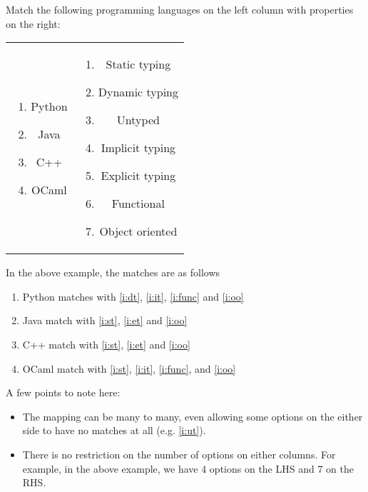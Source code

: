 \documentclass[12pt]{report}
\begin{document}
\begin{mdframed}
Match the following programming languages on the left column with properties on the right:

\begin{tabular}{c @{} c}
\begin{minipage}{0.4\textwidth}
\begin{enumerate}
\item Python
\item Java
\item C++
\item OCaml
\end{enumerate}
\end{minipage}
&
\begin{minipage}{0.4\textwidth}
\begin{enumerate}[label=\Alph*.]
\item \label{i:st} Static typing
\item \label{i:dt} Dynamic typing
\item \label{i:ut} Untyped
\item \label{i:it} Implicit typing
\item \label{i:et} Explicit typing
\item \label{i:func} Functional
\item \label{i:oo} Object oriented
\end{enumerate}
\end{minipage}
\end{tabular}
\end{mdframed}

In the above example, the matches are as follows
\begin{enumerate}
\item Python matches with \ref{i:dt}, \ref{i:it}, \ref{i:func} and \ref{i:oo}
\item Java match with \ref{i:st}, \ref{i:et} and \ref{i:oo}
\item C++ match with \ref{i:st}, \ref{i:et} and \ref{i:oo}
\item OCaml match with \ref{i:st}, \ref{i:it}, \ref{i:func},  and \ref{i:oo}
\end{enumerate}

A few points to note here:
\begin{itemize}
\item The mapping can be many to many, even allowing some options on the either side to have no matches at all (e.g. \ref{i:ut}).
\item There is no restriction on the number of options on either columns. For example, in the above example, we have 4 options on the LHS and 7 on the RHS.
\end{itemize}
\end{document}
